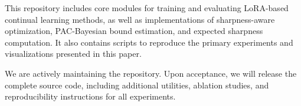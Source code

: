 \documentclass[letterpaper]{article} %
\begin{document}
This repository includes core modules for training and evaluating LoRA-based continual learning methods, as well as implementations of sharpness-aware optimization, PAC-Bayesian bound estimation, and expected sharpness computation. It also contains scripts to reproduce the primary experiments and visualizations presented in this paper.

We are actively maintaining the repository. Upon acceptance, we will release the complete source code, including additional utilities, ablation studies, and reproducibility instructions for all experiments.










\end{document}
